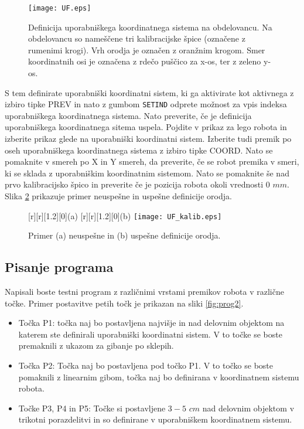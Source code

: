 \begin{figure}[!hbt]
	\centering
	\texttt{[image: UF.eps]}
	\caption{Definicija uporabniškega koordinatnega sistema na obdelovancu. Na obdelovancu so nameščene tri kalibracijske špice (označene z rumenimi krogi). Vrh orodja je označen z oranžnim krogom. Smer koordinatnih osi je označena z rdečo puščico za x-os, ter z zeleno y-os.}
	\label{fig:UFrame}
\end{figure}

S tem definirate uporabniški koordinatni sistem, ki ga aktivirate kot aktivnega z izbiro tipke PREV in nato z gumbom \verb|SETIND| odprete možnost za vpis indeksa uporabniškega koordinatnega sistema. Nato preverite, če je definicija uporabniškega koordinatnega sitema uspela. Pojdite v prikaz za lego robota in izberite prikaz glede na uporabniški koordinatni sistem. Izberite tudi premik po oseh uporabniškega koordinatnega sistema z izbiro tipke COORD. Nato se pomaknite v smereh po X in Y smereh, da preverite, če se robot premika v smeri, ki se sklada z uporabniškim koordinatnim sistemom. Nato se pomaknite še nad prvo kalibracijsko špico in preverite če je pozicija robota okoli vrednosti $0$ $mm$. Slika \ref{fig:UF_kalib} prikazuje primer neuspešne in uspešne definicije orodja.


\begin{figure}[!htb]
	\centering
	[r][1.2][0]{(a)}
	[r][1.2][0]{(b)}
	\texttt{[image: UF\_kalib.eps]}
	\caption{Primer (a) neuspešne in (b) uspešne definicije orodja.}
	\label{fig:UF_kalib}
\end{figure}



\subsection{Pisanje programa}
Napisali boste testni program z različnimi vrstami premikov robota v različne točke. Primer postavitve petih točk je prikazan na sliki \ref{fig:prog2}.

\begin{itemize}
	\item Točka P1: točka naj bo postavljena najvišje in nad delovnim objektom na katerem ste definirali uporabniški koordinatni sistem. V to točke se boste premaknili z ukazom za gibanje po sklepih.
	\item Točka P2: Točka naj bo postavljena pod točko P1. V to točko se boste pomaknili z linearnim gibom, točka naj bo definirana v koordinatnem sistemu robota.
	\item Točke P3, P4 in P5: Točke si postavljene $3-5$ $cm$ nad delovnim objektom v trikotni porazdelitvi in so definirane v uporabniškem koordinatnem sistemu.
\end{itemize}

